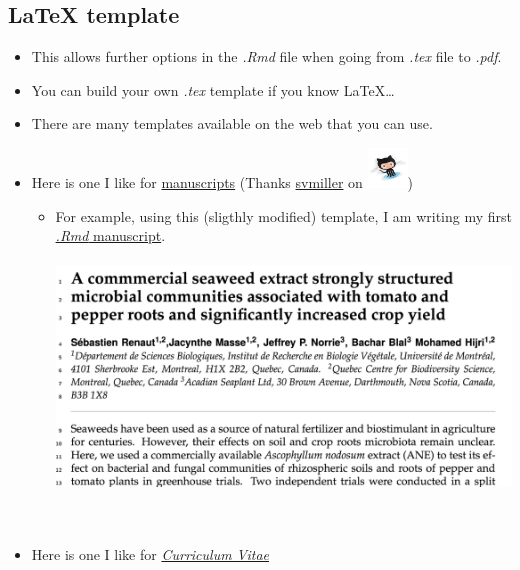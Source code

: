 \documentclass[]{article}
\providecommand{\tightlist}{%
  \setlength{\itemsep}{0pt}\setlength{\parskip}{0pt}}
\begin{document}
\hypertarget{latex-template}{%
\subsection{LaTeX template}\label{latex-template}}

\begin{itemize}
\item
  This allows further options in the \emph{.Rmd} file when going from
  \emph{.tex} file to \emph{.pdf}.
\item
  You can build your own \emph{.tex} template if you know LaTeX\ldots{}
\item
  There are many templates available on the web that you can use.
\item
  Here is one I like for
  \href{https://github.com/svmiller/svm-r-markdown-templates/blob/master/svm-latex-ms.tex}{manuscripts}
  (Thanks \href{https://github.com/svmiller}{svmiller} on
  \includegraphics[width=0.41667in,height=\textheight]{../figures/octocat.png})

  \begin{itemize}
  \tightlist
  \item
    For example, using this (sligthly modified) template, I am writing
    my first
    \href{https://github.com/seb951/Acadian_seaplants/blob/master/manuscript_Rmd/Acadian_seaplants_v5.pdf}{\emph{.Rmd}
    manuscript}.\\
    \hspace*{0.333em}\\
    \includegraphics[width=5.20833in,height=\textheight]{../figures/acadian.png}\\
    \hspace*{0.333em}\\
    \hspace*{0.333em}\\
  \end{itemize}
\item
  Here is one I like for
  \href{https://github.com/svmiller/svm-r-markdown-templates/blob/master/svm-latex-cv.tex}{\emph{Curriculum
  Vitae}}


\end{itemize}
\end{document}
